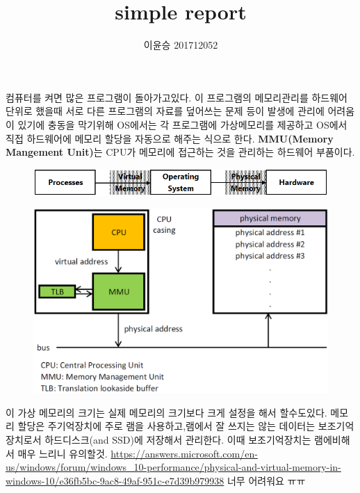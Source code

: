 \documentclass{oblivoir}
\begin{document}
\title{simple report}
\author{이윤승 201712052}
\maketitle
\tableofcontents

컴퓨터를 켜면 많은 프로그램이 돌아가고있다. 이 프로그램의 메모리관리를
하드웨어 단위로 했을때 서로 다른 프로그램의 자료를 덮어쓰는 문제 등이 발생에
관리에 어려움이 있기에 충동을 막기위해 OS에서는 각 프로그램에 가상메모리를 제공하고 OS에서 직접
하드웨어에 메모리 할당을 자동으로 해주는 식으로 한다. \textbf{MMU(Memory Mangement Unit)}는 
CPU가 메모리에 접근하는 것을 관리하는 하드웨어 부품이다.
\begin{figure}[h!]
    \centering
    \includegraphics[scale = 0.5]{virtual_memory.png}
\end{figure}
\begin{figure}[h!]
    \centering
    \includegraphics[scale = 0.5]{MMU.png}
\end{figure}
이 가상 메모리의 크기는 실제 메모리의 크기보다 크게 설정을 해서 할수도있다.
메모리 할당은 주기억장치에 주로 램을 사용하고,램에서 잘 쓰지는 않는 데이터는 보조기억장치로서 하드디스크(and SSD)에 저장해서 관리한다.
이때 보조기억장치는 램에비해서 매우 느리니 유의할것.
\url{https://answers.microsoft.com/en-us/windows/forum/windows_10-performance/physical-and-virtual-memory-in-windows-10/e36fb5bc-9ac8-49af-951c-e7d39b979938}
너무 어려워요 ㅠㅠ
\end{document}
